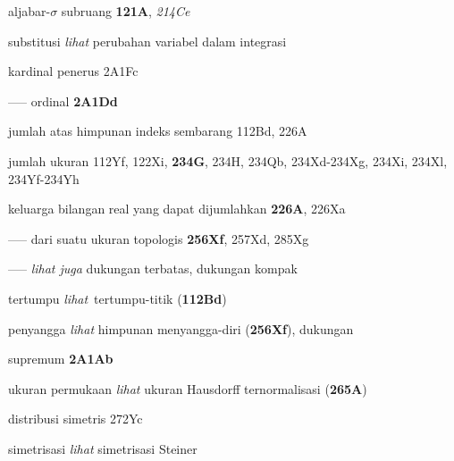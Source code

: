 aljabar-$\sigma$ subruang {\bf 121A},
  {\it 214Ce}

substitusi {\it lihat} perubahan variabel dalam integrasi





kardinal penerus 2A1Fc


----- ordinal {\bf 2A1Dd}


jumlah atas himpunan indeks sembarang 112Bd, 226A

jumlah ukuran 112Yf, 122Xi,
  {\bf 234G}, 234H, 234Qb, 234Xd-234Xg, 
234Xi, 234Xl, 234Yf-234Yh




keluarga bilangan real yang dapat dijumlahkan {\bf 226A}, 226Xa














----- dari suatu ukuran topologis {\bf 256Xf}, 257Xd, 285Xg




----- {\it lihat juga} dukungan terbatas,
  dukungan kompak




{tertumpu {\it lihat}}\
tertumpu-titik ({\bf 112Bd})

penyangga
  {\it lihat} himpunan menyangga-diri ({\bf 256Xf}), dukungan


supremum {\bf 2A1Ab}




ukuran permukaan {\it lihat} ukuran Hausdorff ternormalisasi ({\bf 265A})



distribusi simetris 272Yc










simetrisasi {\it lihat} simetrisasi Steiner






\indexmedskip























